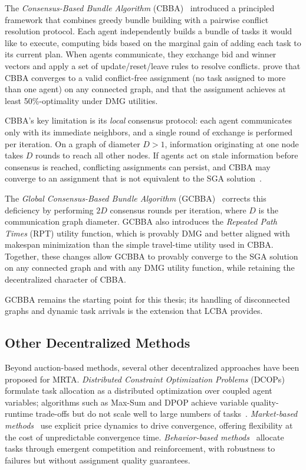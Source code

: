 The \emph{Consensus-Based Bundle Algorithm} (CBBA)~\cite{choi2009consensus}
introduced a principled framework that combines greedy bundle building with
a pairwise conflict resolution protocol.
Each agent independently builds a bundle of tasks it would like to execute,
computing bids based on the marginal gain of adding each task to its current
plan.
When agents communicate, they exchange bid and winner vectors and apply a set
of update/reset/leave rules to resolve conflicts.
\citeauthor{choi2009consensus} prove that CBBA converges to a valid
conflict-free assignment (no task assigned to more than one agent) on any
connected graph, and that the assignment achieves at least
50\%-optimality under DMG utilities.

CBBA's key limitation is its \emph{local} consensus protocol: each agent
communicates only with its immediate neighbors, and a single round of exchange
is performed per iteration.
On a graph of diameter $D > 1$, information originating at one node takes $D$
rounds to reach all other nodes.
If agents act on stale information before consensus is reached, conflicting
assignments can persist, and CBBA may converge to an assignment that is not
equivalent to the SGA solution~\cite{kha2025enhancing}.

The \emph{Global Consensus-Based Bundle Algorithm}
(GCBBA)~\cite{kha2025enhancing} corrects this deficiency by performing $2D$
consensus rounds per iteration, where $D$ is the communication graph diameter.
GCBBA also introduces the \emph{Repeated Path Times} (RPT) utility function,
which is provably DMG and better aligned with makespan minimization than the
simple travel-time utility used in CBBA.
Together, these changes allow GCBBA to provably converge to the SGA solution
on any connected graph and with any DMG utility function, while retaining the
decentralized character of CBBA.

GCBBA remains the starting point for this thesis; its handling of disconnected
graphs and dynamic task arrivals is the extension that LCBA provides.


\subsection{Other Decentralized Methods}
      \label{subsec:bg_other_decentralized}

Beyond auction-based methods, several other decentralized approaches have been
proposed for MRTA.
\emph{Distributed Constraint Optimization Problems} (DCOPs) formulate task
allocation as a distributed optimization over coupled agent variables;
algorithms such as Max-Sum and DPOP achieve variable quality-runtime trade-offs
but do not scale well to large numbers of tasks~\cite{chakraa2023optimization}.
\emph{Market-based methods}~\cite{quinton2023mrta} use explicit price dynamics
to drive convergence, offering flexibility at the cost of unpredictable
convergence time.
\emph{Behavior-based methods}~\cite{parker1998alliance} allocate tasks
through emergent competition and reinforcement, with robustness to failures
but without assignment quality guarantees.

